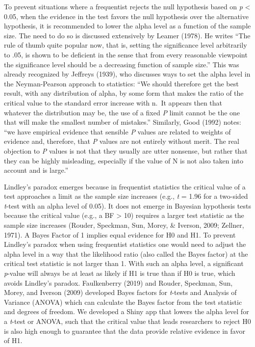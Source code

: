 \documentclass[
  english,
  ,man, a4paper,floatsintext]{apa6}
\begin{document}
To prevent situations where a frequentist rejects the null hypothesis based on \emph{p} \textless{} 0.05, when the evidence in the test favors the null hypothesis over the alternative hypothesis, it is recommended to lower the alpha level as a function of the sample size. The need to do so is discussed extensively by Leamer (1978). He writes ``The rule of thumb quite popular now, that is, setting the significance level arbitrarily to .05, is shown to be deficient in the sense that from every reasonable viewpoint the significance level should be a decreasing function of sample size.'' This was already recognized by Jeffreys (1939), who discusses ways to set the alpha level in the Neyman-Pearson approach to statistics: ``We should therefore get the best result, with any distribution of alpha, by some form that makes the ratio of the critical value to the standard error increase with n.~It appears then that whatever the distribution may be, the use of a fixed \emph{P} limit cannot be the one that will make the smallest number of mistakes.'' Similarly, Good (1992) notes: ``we have empirical evidence that sensible \emph{P} values are related to weights of evidence and, therefore, that \emph{P} values are not entirely without merit. The real objection to \emph{P} values is not that they usually are utter nonsense, but rather that they can be highly misleading, especially if the value of N is not also taken into account and is large.''

Lindley's paradox emerges because in frequentist statistics the critical value of a test approaches a limit as the sample size increases (e.g., \emph{t} = 1.96 for a two-sided \emph{t}-test with an alpha level of 0.05). It does not emerge in Bayesian hypothesis tests because the critical value (e.g., a BF \textgreater{} 10) requires a larger test statistic as the sample size increases (Rouder, Speckman, Sun, Morey, \& Iverson, 2009; Zellner, 1971). A Bayes Factor of 1 implies equal evidence for H0 and H1. To prevent Lindley's paradox when using frequentist statistics one would need to adjust the alpha level in a way that the likelihood ratio (also called the Bayes factor) at the critical test statistic is not larger than 1. With such an alpha level, a significant \emph{p}-value will always be at least as likely if H1 is true than if H0 is true, which avoids Lindley's paradox. Faulkenberry (2019) and Rouder, Speckman, Sun, Morey, and Iverson (2009) developed Bayes factors for \emph{t}-tests and Analysis of Variance (ANOVA) which can calculate the Bayes factor from the test statistic and degrees of freedom. We developed a Shiny app that lowers the alpha level for a \emph{t}-test or ANOVA, such that the critical value that leads researchers to reject H0 is also high enough to guarantee that the data provide relative evidence in favor of H1.
\end{document}
